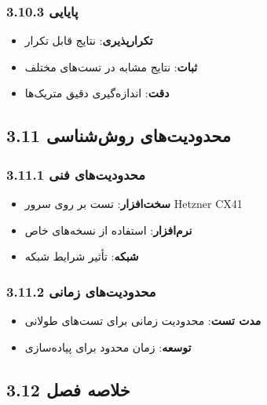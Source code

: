 \documentclass[
]{article}
\providecommand{\tightlist}{%
  \setlength{\itemsep}{0pt}\setlength{\parskip}{0pt}}
\begin{document}
\subsubsection{3.10.3 پایایی}\label{ux67eux627ux6ccux627ux6ccux6cc}

\begin{itemize}
\tightlist
\item
  \textbf{تکرارپذیری}: نتایج قابل تکرار
\item
  \textbf{ثبات}: نتایج مشابه در تست‌های مختلف
\item
  \textbf{دقت}: اندازه‌گیری دقیق متریک‌ها
\end{itemize}

\subsection{3.11 محدودیت‌های
روش‌شناسی}\label{ux645ux62dux62fux648ux62fux6ccux62aux647ux627ux6cc-ux631ux648ux634ux634ux646ux627ux633ux6cc}

\subsubsection{3.11.1 محدودیت‌های
فنی}\label{ux645ux62dux62fux648ux62fux6ccux62aux647ux627ux6cc-ux641ux646ux6cc-1}

\begin{itemize}
\tightlist
\item
  \textbf{سخت‌افزار}: تست بر روی سرور Hetzner CX41
\item
  \textbf{نرم‌افزار}: استفاده از نسخه‌های خاص
\item
  \textbf{شبکه}: تأثیر شرایط شبکه
\end{itemize}

\subsubsection{3.11.2 محدودیت‌های
زمانی}\label{ux645ux62dux62fux648ux62fux6ccux62aux647ux627ux6cc-ux632ux645ux627ux646ux6cc-1}

\begin{itemize}
\tightlist
\item
  \textbf{مدت تست}: محدودیت زمانی برای تست‌های طولانی
\item
  \textbf{توسعه}: زمان محدود برای پیاده‌سازی
\end{itemize}

\subsection{3.12 خلاصه
فصل}\label{ux62eux644ux627ux635ux647-ux641ux635ux644-1}
\end{document}
